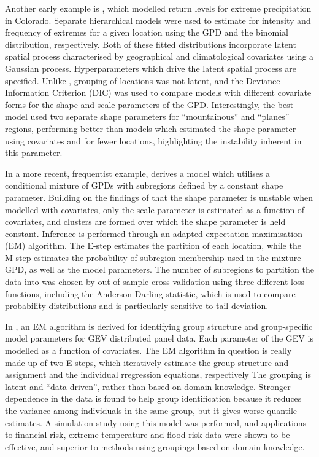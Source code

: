 \documentclass{article}
\numberwithin{equation}{section}
\begin{document}
Another early example is \citet{Cooley2007}, which modelled return levels for extreme precipitation in Colorado.
Separate hierarchical models were used to estimate for intensity and frequency of extremes for a given location using the GPD and the binomial distribution, respectively.
Both of these fitted distributions incorporate latent spatial process characterised by geographical and climatological covariates using a Gaussian process. 
Hyperparameters which drive the latent spatial process are specified.
Unlike \citet{Bottolo2003}, grouping of locations was not latent, and the Deviance Information Criterion (DIC) was used to compare models with different covariate forms for the shape and scale parameters of the GPD.
Interestingly, the best model used two separate shape parameters for ``mountainous'' and ``planes'' regions, performing better than models which estimated the shape parameter using covariates and for fewer locations, highlighting the instability inherent in this parameter.

In a more recent, frequentist example, \citet{Carreau2017} derives a model which utilises a conditional mixture of GPDs with subregions defined by a constant shape parameter.
Building on the findings of \citet{Cooley2007} that the shape parameter is unstable when modelled with covariates, only the scale parameter is estimated as a function of covariates, and clusters are formed over which the shape parameter is held constant. 
Inference is performed through an adapted expectation-maximisation (EM) algorithm. 
The E-step estimates the partition of each location, while the M-step estimates the probability of subregion membership used in the mixture GPD, as well as the model parameters.
The number of subregions to partition the data into was chosen by out-of-sample cross-validation using three different loss functions, including the Anderson-Darling statistic, which is used to compare probability distributions and is particularly sensitive to tail deviation.

In \citet{Dupuis2023}, an EM algorithm is derived for identifying group structure and group-specific model parameters for GEV distributed panel data.
Each parameter of the GEV is modelled as a function of covariates. 
The EM algorithm in question is really made up of two E-steps, which iteratively estimate the group structure and assignment and the individual rregression equations, respectively
The grouping is latent and ``data-driven'', rather than based on domain knowledge. 
Stronger dependence in the data is found to help group identification because it reduces the variance among individuals in the same group, but it gives worse quantile estimates. 
A simulation study using this model was performed, and applications to financial risk, extreme temperature and flood risk data were shown to be effective, and superior to methods using groupings based on domain knowledge.
\end{document}
